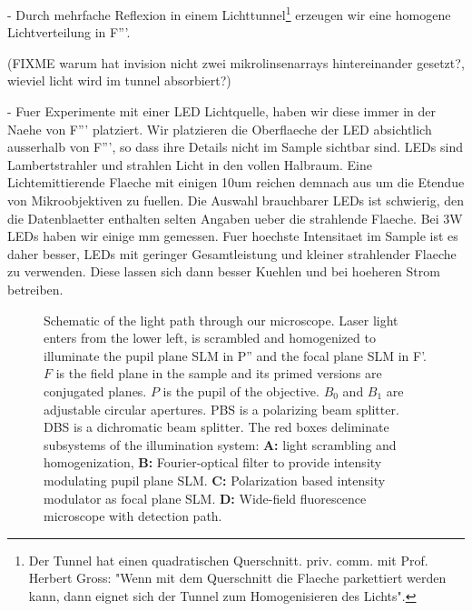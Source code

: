 - Durch mehrfache Reflexion in einem Lichttunnel\footnote{Der Tunnel
   hat einen quadratischen Querschnitt. priv. comm. mit Prof. Herbert
   Gross: "Wenn mit dem Querschnitt die Flaeche parkettiert werden
   kann, dann eignet sich der Tunnel zum Homogenisieren des Lichts".}
   erzeugen wir eine homogene Lichtverteilung in F'''. 
   
   (FIXME warum hat invision nicht zwei mikrolinsenarrays
   hintereinander gesetzt?, wieviel licht wird im tunnel absorbiert?)

 - Fuer Experimente mit einer LED Lichtquelle, haben wir diese immer
   in der Naehe von F''' platziert. Wir platzieren die Oberflaeche der
   LED absichtlich ausserhalb von F''', so dass ihre Details nicht im
   Sample sichtbar sind. LEDs sind Lambertstrahler und strahlen Licht
   in den vollen Halbraum. Eine Lichtemittierende Flaeche mit einigen
   10um reichen demnach aus um die Etendue von Mikroobjektiven zu
   fuellen. Die Auswahl brauchbarer LEDs ist schwierig, den die
   Datenblaetter enthalten selten Angaben ueber die strahlende
   Flaeche. Bei 3W LEDs haben wir einige mm gemessen. Fuer hoechste
   Intensitaet im Sample ist es daher besser, LEDs mit geringer
   Gesamtleistung und kleiner strahlender Flaeche zu verwenden. Diese
   lassen sich dann besser Kuehlen und bei hoeheren Strom betreiben.


\begin{figure}[!htbp]
  \centering
  \caption{Schematic of the light path through our microscope. Laser
    light enters from the lower left, is scrambled and homogenized to
    illuminate the pupil plane SLM in P'' and the focal plane SLM in
    F'. $F$ is the field plane in the sample and its primed versions
    are conjugated planes. $P$ is the pupil of the objective. $B_0$
    and $B_1$ are adjustable circular apertures. PBS is a polarizing
    beam splitter. DBS is a dichromatic beam splitter.  The red boxes
    deliminate subsystems of the illumination system: {\bf A:} light
    scrambling and homogenization, {\bf B:} Fourier-optical filter to
    provide intensity modulating pupil plane SLM. {\bf C:} Polarization
    based intensity modulator as focal plane SLM. {\bf D:} Wide-field
    fluorescence microscope with detection path.}
  \label{fig:memi-real}
\end{figure}





